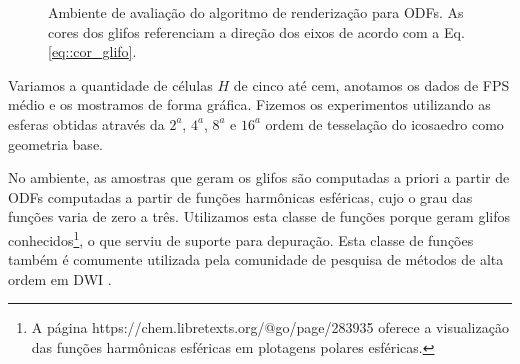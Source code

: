 \documentclass[
    12pt,                %
    oneside,            %
    a4paper,            %
    english,            %
    french,                %
    spanish,            %
    brazil                %
    ]{abntex2}
\begin{document}
\begin{figure}[ht]
     \caption{Ambiente de avaliação do algoritmo de renderização para ODFs. As cores dos glifos referenciam a direção dos eixos de acordo com a Eq. \ref{eq::cor_glifo}.}
    \label{fig::ambiente_validacao}
\end{figure}

Variamos a quantidade de células $H$ de cinco até cem, anotamos os dados de FPS médio e os mostramos de forma gráfica. Fizemos os experimentos utilizando  as esferas obtidas através da $2^a$, $4^a$, $8^a$ e $16^a$ ordem de tesselação do icosaedro como geometria base.

 No ambiente, as amostras que geram os glifos são computadas a priori a partir de ODFs computadas a partir de funções harmônicas esféricas, cujo o grau das funções varia de zero a três. Utilizamos esta classe de funções porque geram glifos conhecidos\footnote{A página https://chem.libretexts.org/@go/page/283935 oferece a visualização das funções harmônicas esféricas em plotagens polares esféricas.}, o que serviu de suporte para depuração. Esta classe de funções também é comumente utilizada pela comunidade de pesquisa de métodos de alta ordem em DWI \cite{Tournier2004DirectEO, tournier2007, descoteaux2007_QBI}.%
\end{document}
